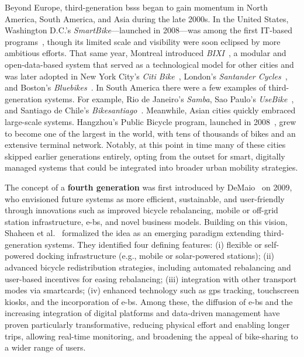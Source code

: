 Beyond Europe, third-generation \acp{bss} began to gain momentum in North America, South America, and Asia during the late 2000s. In the United States, Washington D.C.'s \textit{SmartBike}—launched in 2008—was among the first IT-based programs~\cite{Silverman2008}, though its limited scale and visibility were soon eclipsed by more ambitious efforts. That same year, Montreal introduced \textit{BIXI}~\cite{Entreprisesàvendre2025, Shaheen2010}, a modular and open-data-based system that served as a technological model for other cities and was later adopted in New York City's \textit{Citi Bike}~\cite{RudinCenter2015}, London's \textit{Santander Cycles}~\cite{BBC2020}, and Boston's \textit{Bluebikes}~\cite{BluebikesAbout}. In South America there were a few examples of third-generation systems. For example, Rio de Janeiro's \textit{Samba}, Sao Paulo's \textit{UseBike}~\cite{Shaheen2010}, and Santiago de Chile's \textit{Bikesantiago}~\cite{Shaheen2010}. Meanwhile, Asian cities quickly embraced large-scale systems. Hangzhou’s Public Bicycle program, launched in 2008~\cite{Guzman2011}, grew to become one of the largest in the world, with tens of thousands of bikes and an extensive terminal network. Notably, at this point in time many of these cities skipped earlier generations entirely, opting from the outset for smart, digitally managed systems that could be integrated into broader urban mobility strategies.

The concept of a \textbf{fourth generation} was first introduced by DeMaio~\cite{DeMaio2009} on 2009, who envisioned future systems as more efficient, sustainable, and user-friendly through innovations such as improved bicycle rebalancing, mobile or off-grid station infrastructure, \acp{e-b}, and novel business models. Building on this vision, Shaheen et al.~\cite{Shaheen2010} formalized the idea as an emerging paradigm extending third-generation systems. They identified four defining features: (i) flexible or self-powered docking infrastructure (e.g., mobile or solar-powered stations); (ii) advanced bicycle redistribution strategies, including automated rebalancing and user-based incentives for easing rebalancing; (iii) integration with other transport modes via smartcards; (iv) enhanced technology such as \ac{gps} tracking, touchscreen kiosks, and the incorporation of \acp{e-b}. Among these, the diffusion of \acp{e-b} and the increasing integration of digital platforms and data-driven management have proven particularly transformative, reducing physical effort and enabling longer trips, allowing real-time monitoring, and broadening the appeal of bike-sharing to a wider range of users.

